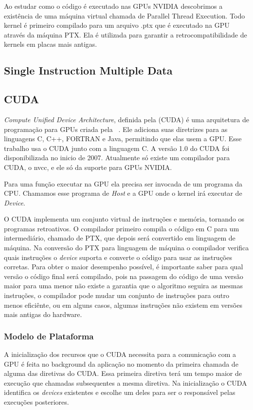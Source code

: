 Ao estudar como o código é executado nas GPUs NVIDIA descobrimos a existência de uma máquina virtual chamada de Parallel Thread Execution\cite{ptx}.
Todo kernel é primeiro compilado para um arquivo .ptx que é executado na GPU através da máquina PTX. Ela é utilizada para garantir 
a retrocompatibilidade de kernels em placas mais antigas.
\subsection{Single Instruction Multiple Data}

\subsection{CUDA}
\textit{Compute Unified Device Architecture}, definida pela (CUDA) é uma arquitetura de programação para GPUs criada 
pela ~\cite{nvidia2007compute}.
Ele adiciona suas diretrizes para as linguagens C, C++, FORTRAN e Java, permitindo que elas usem a GPU.
Esse trabalho usa o CUDA junto com a linguagem C.
A versão 1.0 do CUDA foi disponibilizada no inicio de 2007. Atualmente só existe um compilador para CUDA, o nvcc,
e ele só da suporte para GPUs NVIDIA.

Para uma função executar na GPU ela precisa ser invocada de um programa da CPU. Chamamos esse programa de \textit{Host}
e a GPU onde o kernel irá executar de \textit{Device}.

O CUDA implementa um conjunto virtual de instruções e memória, tornando os programas retroativos. O compilador
primeiro compila o código em C para um intermediário, chamado de PTX, que depois será convertido em linguagem
de máquina. Na conversão do PTX para linguagem de máquina o compilador verifica quais instruções o \textit{device}
suporta e converte o código para usar as instruções corretas.
Para obter o maior desempenho possível, é importante saber para qual versão o código final será compilado, 
pois na passagem do código de uma versão maior para uma menor não existe a garantia que o algoritmo seguira as mesmas instruções, 
o compilador pode mudar um conjunto de instruções para outro menos eficiênte, ou em alguns casos, algumas instruções não existem em
versões mais antigas do hardware.

\subsubsection{Modelo de Plataforma}
A inicialização dos recursos que o CUDA necessita para a comunicação com a GPU é feita no background da
aplicação no momento da primeira chamada de alguma das diretivas do CUDA. Essa primeira diretiva terá um
tempo maior de execução que chamadas subsequentes a mesma diretiva. Na inicialização o CUDA identifica
os \textit{devices} existentes e escolhe um deles para ser o responsável pelas execuções posteriores.

